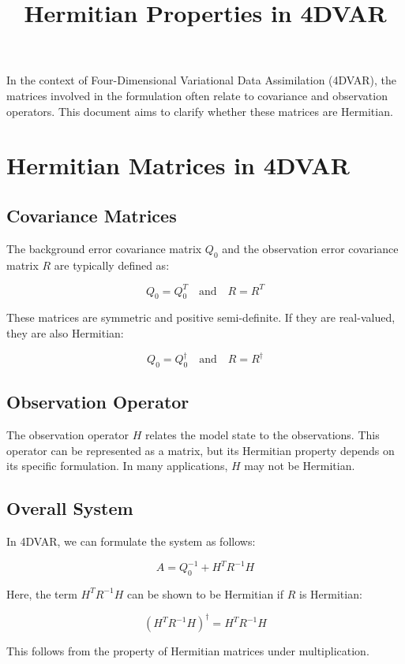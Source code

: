 \documentclass{article}
\title{Hermitian Properties in 4DVAR}
\author{}
\date{}
\begin{document}
\maketitle

In the context of Four-Dimensional Variational Data Assimilation (4DVAR), the matrices involved in the formulation often relate to covariance and observation operators. This document aims to clarify whether these matrices are Hermitian.

\section{Hermitian Matrices in 4DVAR}

\subsection{Covariance Matrices}

The background error covariance matrix \( Q_0 \) and the observation error covariance matrix \( R \) are typically defined as:

\[
Q_0 = Q_0^T \quad \text{and} \quad R = R^T
\]

These matrices are symmetric and positive semi-definite. If they are real-valued, they are also Hermitian:

\[
Q_0 = Q_0^\dagger \quad \text{and} \quad R = R^\dagger
\]

\subsection{Observation Operator}

The observation operator \( H \) relates the model state to the observations. This operator can be represented as a matrix, but its Hermitian property depends on its specific formulation. In many applications, \( H \) may not be Hermitian.

\subsection{Overall System}

In 4DVAR, we can formulate the system as follows:

\[
A = Q_0^{-1} + H^T R^{-1} H
\]

Here, the term \( H^T R^{-1} H \) can be shown to be Hermitian if \( R \) is Hermitian:

\[
(H^T R^{-1} H)^\dagger = H^T R^{-1} H
\]

This follows from the property of Hermitian matrices under multiplication.
\end{document}
